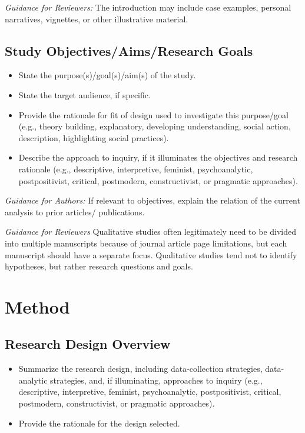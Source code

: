 \documentclass[acmsmall,screen,anonymous,review]{acmart}
\begin{document}
\textit{Guidance for Reviewers:} The introduction may include case examples, personal narratives, vignettes, or other illustrative material.

\subsection{Study Objectives/Aims/Research Goals}

\begin{itemize}
    \item State the purpose(s)/goal(s)/aim(s) of the study.
    \item State the target audience, if specific.
    \item Provide the rationale for fit of design used to investigate this purpose/goal (e.g., theory building, explanatory, developing understanding, social action, description, highlighting social practices).
    \item Describe the approach to inquiry, if it illuminates the objectives and research rationale (e.g., descriptive, interpretive, feminist, psychoanalytic, postpositivist, critical, postmodern, constructivist, or pragmatic approaches).
\end{itemize}

\textit{Guidance for Authors:} If relevant to objectives, explain the relation of the current analysis to prior articles/ publications.

\textit{Guidance for Reviewers} Qualitative studies often legitimately need to be divided into multiple manuscripts because of journal article page limitations, but each manuscript should have a separate focus. Qualitative studies tend not to identify hypotheses, but rather research questions and goals.

\section{Method}

\subsection{Research Design Overview}

\begin{itemize}
    \item Summarize the research design, including data-collection strategies, data-analytic
strategies, and, if illuminating, approaches to inquiry (e.g., descriptive, interpretive, feminist,
psychoanalytic, postpositivist, critical, postmodern, constructivist, or pragmatic approaches).
\item Provide the rationale for the design selected.
\end{itemize}
\end{document}
